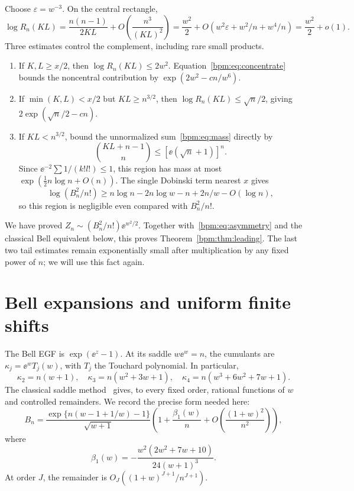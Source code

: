 \documentclass[11pt,a4paper]{article}
\theoremstyle{remark}\newtheorem{remark}[theorem]{Remark}%
\begin{document}
Choose $\varepsilon=w^{-3}$. On the central rectangle,
\[
 \log R_n(KL)=\frac{n(n-1)}{2KL}+O\!\left(\frac{n^3}{(KL)^2}\right)
 =\frac{w^2}2+O(w^2\varepsilon+w^2/n+w^4/n)
 =\frac{w^2}2+o(1).
\]
Three estimates control the complement, including rare small products.
\begin{enumerate}
\item If $K,L\ge x/2$, then $\log R_n(KL)\le2w^2$. Equation~\eqref{bpm:eq:concentrate} bounds the noncentral contribution by $\exp(2w^2-cn/w^6)$.
\item If $\min(K,L)<x/2$ but $KL\ge n^{3/2}$, then $\log R_n(KL)\le\sqrt n/2$, giving $2\exp(\sqrt n/2-cn)$.
\item If $KL<n^{3/2}$, bound the unnormalized sum~\eqref{bpm:eq:mass} directly by
\[
 \binom{KL+n-1}{n}\le[\ee(\sqrt n+1)]^n.
\]
Since $\ee^{-2}\sum1/(k!l!)\le1$, this region has mass at most $\exp(\tfrac12n\log n+O(n))$. The single Dobinski term nearest $x$ gives
\[
 \log(B_n^2/n!)\ge n\log n-2n\log w-n+2n/w-O(\log n),
\]
so this region is negligible even compared with $B_n^2/n!$.
\end{enumerate}
We have proved $Z_n\sim(B_n^2/n!)\ee^{w^2/2}$. Together with~\eqref{bpm:eq:asymmetry} and the classical Bell equivalent below, this proves Theorem~\ref{bpm:thm:leading}. The last two tail estimates remain exponentially small after multiplication by any fixed power of $n$; we will use this fact again.

\section{Bell expansions and uniform finite shifts}\label{bpm:sec:Bell}
The Bell EGF is $\exp(\ee^z-1)$. At its saddle $w\ee^w=n$, the cumulants are $\kappa_j=\ee^w T_j(w)$, with $T_j$ the Touchard polynomial. In particular,
\[
 \kappa_2=n(w+1),\quad \kappa_3=n(w^2+3w+1),\quad
 \kappa_4=n(w^3+6w^2+7w+1).
\]
The classical saddle method~\cite{OR} gives, to every fixed order, rational functions of $w$ and controlled remainders. We record the precise form needed here:
\begin{equation}\label{bpm:eq:Bell}
 B_n=\frac{\exp\{n(w-1+1/w)-1\}}{\sqrt{w+1}}
 \left(1+\frac{\beta_1(w)}n+O\!\left(\frac{(1+w)^2}{n^2}\right)\right),
\end{equation}
where
\begin{equation}\label{bpm:eq:beta}
 \beta_1(w)=-\frac{w^2(2w^2+7w+10)}{24(w+1)^3}.
\end{equation}
At order $J$, the remainder is $O_J((1+w)^{J+1}/n^{J+1})$.
\end{document}
